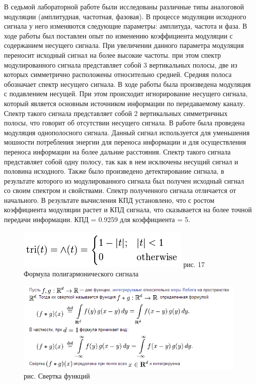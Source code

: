 \documentclass[10pt,a4paper]{report}
\begin{document}
В седьмой лабораторной работе были исследованы различные типы аналоговой модуляции (амплитудная, частотная, фазовая). В процессе модуляции исходного сигнала у него 
изменяются следующие параметры: амплитуда, частота и фаза. В ходе работы был поставлен опыт по изменению коэффициента модуляции с содержанием несущего сигнала.
При увеличении данного параметра модуляция переносит исходный сигнал на более высокие частоты. при этом спектр модулированного сигнала представляет собой 3 вертикальных полосы, 
две из которых симметрично расположены относительно средней. Средняя полоса обозначает спектр несущего сигнала. В ходе работы была произведена модуляция с подавлением несущей.
При этом происходит игнорирование несущего сигнала, который является основным источником информации по передаваемому каналу. Спектр такого сигнала представляет собой 2 вертикальных
 симметричных полосы, что говорит об отсутствии несущего сигнала. В работе была проведена модуляция однополосного сигнала. Данный сигнал используется для уменьшения мошности 
потребления энергии для переноса информации и для осуществления переноса информации на более дальние расстояния. Спектр такого сигнала представляет собой одну полосу,
так как в нем исключены несущий сигнал и половина исходного. Также было произведено детектирование сигнала, в результате которого из модулированного сигнала был получен исходный сигнал
со своим спектром и свойствами. Спектр полученного сигнала отличается от начального. В результате вычисления КПД установлено, что с ростом коэффициента модуляции 
растет и КПД сигнала, что сказывается на более точной передачи информации.
КПД = 0.9259 для коэффициента = 5.
\begin{figure}
\begin{center}
\includegraphics[angle=0, scale = 0.8]{17.png}\newline
рис. 17    Формула полигармонического сигнала\newline
\end{center}
\end{figure}
\begin{figure}
\begin{center}
\includegraphics[angle=0, scale = 0.8]{18.png}\newline
рис.   Свертка функций
\end{center}
\end{figure}
\end{document}

